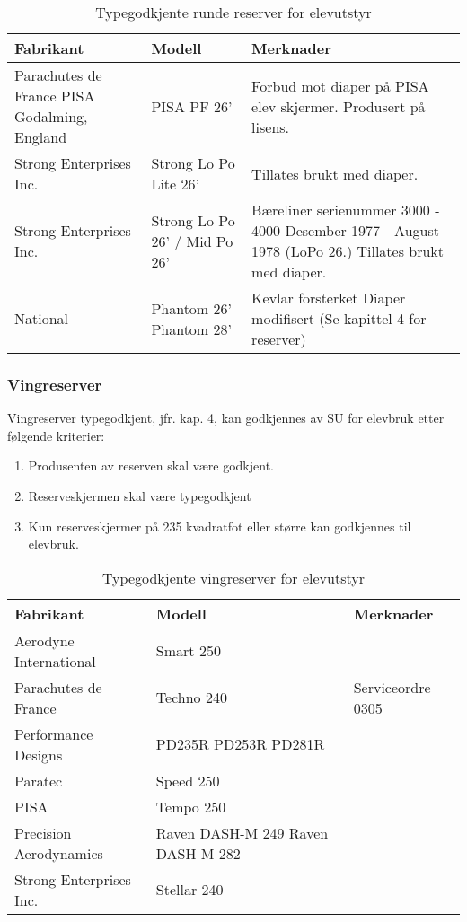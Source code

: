 \begin{table}
	\caption{Typegodkjente runde reserver for elevutstyr}
	\begin{tabular}{ | p{4cm} | p{2cm} | p{4cm} | }
		\hline
		Fabrikant & Modell & Merknader \\
		\hline
		Parachutes de France
		PISA
		Godalming, England &
		PISA PF 26' &
		Forbud mot diaper på PISA elev skjermer.
		Produsert på lisens. \\
		\hline
		Strong Enterprises Inc. & Strong Lo Po Lite 26' & Tillates brukt med diaper. \\
		\hline
		Strong Enterprises Inc. &
		Strong Lo Po 26' /
		Mid Po 26' &
		Bæreliner serienummer 3000 -
		4000 Desember 1977 - August
		1978 (LoPo 26.)
		Tillates brukt med diaper. \\
		\hline
		National &
		Phantom 26'
		Phantom 28' &
		Kevlar forsterket
		Diaper modifisert
		(Se kapittel 4 for reserver) \\
		\hline
	\end{tabular}
\end{table}

\subsubsection{Vingreserver}
Vingreserver typegodkjent, jfr. kap. 4, kan godkjennes av SU for elevbruk etter følgende kriterier:
\begin{enumerate}
	\item Produsenten av reserven skal være godkjent.
	\item Reserveskjermen skal være typegodkjent
	\item Kun reserveskjermer på 235 kvadratfot eller større kan godkjennes til elevbruk.
\end{enumerate}

\begin{table}
	\caption{Typegodkjente vingreserver for elevutstyr}
	\begin{tabular}{ | p{4cm} | p{2cm} | p{4cm} | }
		\hline
		Fabrikant & Modell & Merknader \\
		\hline
		Aerodyne International & Smart 250 & \\
		\hline
		Parachutes de France & Techno 240 & Serviceordre 0305 \\
		\hline
		Performance Designs & PD235R PD253R PD281R & \\
		\hline
		Paratec & Speed 250 & \\
		\hline
		PISA & Tempo 250 & \\
		\hline
		Precision Aerodynamics & Raven DASH-M 249 Raven DASH-M 282 & \\
		\hline
		Strong Enterprises Inc. & Stellar 240 & \\
		\hline
	\end{tabular}
\end{table}


